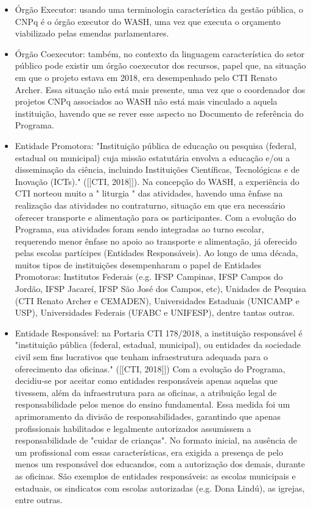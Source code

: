 \begin{itemize}
\item Órgão Executor: usando uma terminologia característica da gestão pública, o CNPq é o órgão executor do WASH, uma vez que executa o orçamento viabilizado pelas emendas parlamentares.
\item Órgão Coexecutor: também, no contexto da linguagem característica do setor público pode existir um órgão coexecutor dos recursos, papel que, na situação em que o projeto estava em 2018, era desempenhado pelo CTI Renato Archer. Essa situação não está mais presente, uma vez que o coordenador dos projetos CNPq associados ao WASH não está mais vinculado a aquela instituição, havendo que se rever esse aspecto no Documento de referência do Programa.
\item Entidade Promotora: "Instituição pública de educação ou pesquisa (federal, estadual ou municipal) cuja missão estatutária envolva a educação e/ou a disseminação da ciência, incluindo Instituições Científicas, Tecnológicas e de Inovação (ICTs)." ([[CTI, 2018]]). Na concepção do WASH, a experiência do CTI norteou muito a " liturgia " das atividades, havendo uma ênfase na realização das atividades no contraturno, situação em que era necessário oferecer transporte e alimentação para os participantes. Com a evolução do Programa, sua atividades foram sendo integradas ao turno escolar, requerendo menor ênfase no apoio ao transporte e alimentação, já oferecido pelas escolas partícipes (Entidades Responsáveis). Ao longo de uma década, muitos tipos de instituições desempenharam o papel de Entidades Promotoras: Institutos Federais (e.g. IFSP Campinas, IFSP Campos do Jordão, IFSP Jacareí, IFSP São José dos Campos, etc), Unidades de Pesquisa (CTI Renato Archer e CEMADEN), Universidades Estaduais (UNICAMP e USP), Universidades Federais (UFABC e UNIFESP), dentre tantas outras.
\item Entidade Responsável: na Portaria CTI 178/2018, a instituição responsável é "instituição pública (federal, estadual, municipal), ou entidades da sociedade civil sem fins lucrativos que tenham infraestrutura adequada para o oferecimento das oficinas."  ([[CTI, 2018]])  Com a evolução do Programa, decidiu-se por aceitar como entidades responsáveis apenas aquelas que tivessem, além da infraestrutura para as oficinas, a atribuição legal de responsabilidade pelos menos do ensino fundamental. Essa medida foi um aprimoramento da divisão de responsabilidades, garantindo que apenas profissionais habilitados e legalmente autorizados assumissem a responsabilidade de "cuidar de crianças". No formato inicial, na ausência de um profissional com essas características, era exigida a presença de pelo menos um responsável dos educandos, com a autorização dos demais, durante as oficinas. São exemplos de entidades responsáveis: as escolas municipais e estaduais, os sindicatos com escolas autorizadas (e.g. Dona Lindú), as igrejas, entre outras.
\end{itemize}

